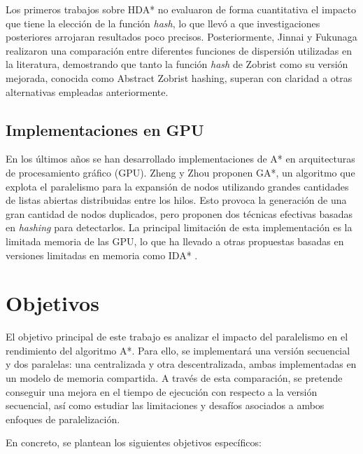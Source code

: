 \documentclass[a4paper,12pt]{article}
\begin{document}
Los primeros trabajos sobre HDA* no evaluaron de forma cuantitativa el impacto que tiene la elección de la función \textit{hash}, lo que llevó a que investigaciones posteriores arrojaran resultados poco precisos. Posteriormente, Jinnai y Fukunaga \cite{jinnai2016abstract} realizaron una comparación entre diferentes funciones de dispersión utilizadas en la literatura, demostrando que tanto la función \textit{hash} de Zobrist como su versión mejorada, conocida como Abstract Zobrist hashing, superan con claridad a otras alternativas empleadas anteriormente.


\subsection{Implementaciones en GPU}

En los últimos años se han desarrollado implementaciones de A* en arquitecturas de procesamiento gráfico (GPU). Zheng y Zhou \cite{zhou2015massively} proponen GA*, un algoritmo que explota el paralelismo para la expansión de nodos utilizando grandes cantidades de listas abiertas distribuidas entre los hilos. Esto provoca la generación de una gran cantidad de nodos duplicados, pero proponen dos técnicas efectivas basadas en \textit{hashing} para detectarlos. La principal limitación de esta implementación es la limitada memoria de las GPU, lo que ha llevado a otras propuestas basadas en versiones limitadas en memoria como IDA* \cite{horie2017block}.

\newpage
\section{Objetivos} \label{sec:objetivos}

El objetivo principal de este trabajo es analizar el impacto del paralelismo en el rendimiento del algoritmo A*. Para ello, se implementará una versión secuencial y dos paralelas: una centralizada y otra descentralizada, ambas implementadas en un modelo de memoria compartida. A través de esta comparación, se pretende conseguir una mejora en el tiempo de ejecución con respecto a la versión secuencial, así como estudiar las limitaciones y desafíos asociados a ambos enfoques de paralelización.

En concreto, se plantean los siguientes objetivos específicos:
\end{document}
